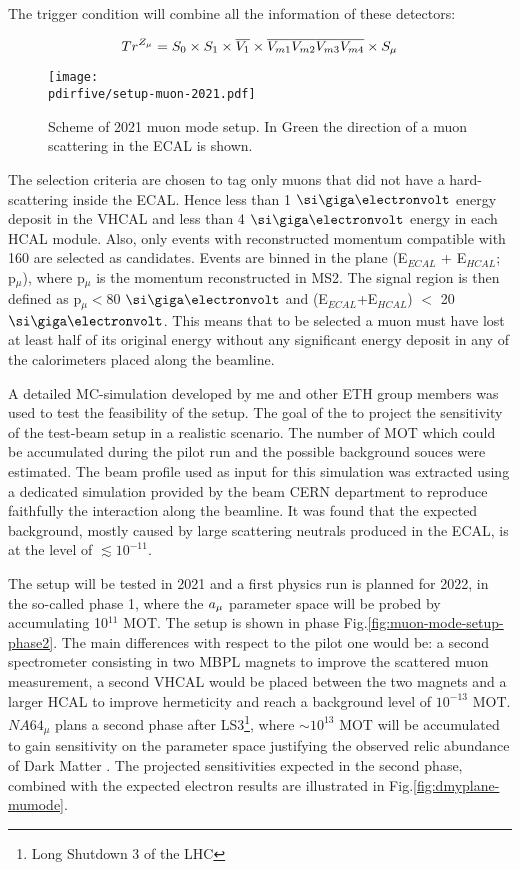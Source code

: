 The trigger condition will combine all the information of these detectors:

\begin{equation}
\label{eq:trigger-mumode}
Tr^{Z_{\mu}} = S_0 \times S_1 \times \overline{V_1} \times \overline{V_{m1}}\overline{V_{m2}}\overline{V_{m3}}\overline{V_{m4}}\times S_{\mu}
\end{equation}

\begin{figure}[bth!]
  \centering
  \texttt{[image: \\pdirfive/setup-muon-2021.pdf]}
  \caption[Sketch of muon mode setup 2021 for phase 1]{Scheme of 2021 muon mode setup. In Green the direction of a muon scattering in the ECAL is shown.}
  \label{fig:muon-mode-setup}
\end{figure}

The selection criteria are chosen to tag only muons that did not have a hard-scattering inside the ECAL. Hence less than 1 $\gev$ energy deposit in the VHCAL and less than 4 $\gev$ energy in each HCAL module. Also, only events with reconstructed momentum compatible with 160 \gev are selected as candidates. Events are binned in the plane (E$_{ECAL}$ + E$_{HCAL}$; p$_{\mu}$), where p$_{\mu}$ is the momentum reconstructed in MS2. The signal region is then defined as p$_{\mu} <$80 $\gev$ and (E$_{ECAL}$+E$_{HCAL}$) $<$ 20 $\gev$. This means that to be selected a muon must have lost at least half of its original energy without any significant energy deposit in any of the calorimeters placed along the beamline.

A detailed MC-simulation developed by me and other ETH group members was used to test the feasibility of the setup. The goal of the to project the sensitivity of the test-beam setup in a realistic scenario. The number of MOT which could be accumulated during the pilot run and the possible background souces were estimated. The beam profile used as input for this simulation was extracted using a dedicated simulation provided by the beam CERN department to reproduce faithfully the interaction along the beamline. It was found that the expected background, mostly caused by large scattering neutrals produced in the ECAL, is at the level of $\lesssim 10^{-11}$. 

The setup will be tested in 2021 and a first physics run is planned for 2022, in the so-called phase 1, where the $a_{\mu}$ parameter space will be probed by accumulating 10$^{11}$ MOT. The setup is shown in phase Fig.\ref{fig:muon-mode-setup-phase2}. The main differences with respect to the pilot one would be: a second spectrometer consisting in two MBPL magnets to improve the scattered muon measurement, a second VHCAL would be placed between the two magnets and a larger HCAL to improve hermeticity and reach a background level of $10^{-13}$ MOT. $NA64_{\mu}$ plans a second phase after LS3\footnote{Long Shutdown 3 of the LHC}, where $\sim 10^{13}$ MOT will be accumulated to gain sensitivity on the parameter space justifying the observed relic abundance of Dark Matter \cite{Gninenko:2640930}. The projected sensitivities expected in the second phase, combined with the expected electron results are illustrated in Fig.\ref{fig:dmyplane-mumode}.

